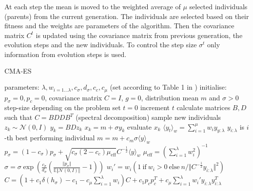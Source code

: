 At each step the mean is moved to the weighted average of $\mu$ selected individuals (parents) from the current generation. The individuals are selected based on their fitness and the weights are parameters of the algorithm. Then the covariance matrix $C^t$ is updated using the covariance matrix from previous generation, the evolution steps and the new individuals. To control the step size $\sigma^t$ only information from evolution steps is used.\cite{hansen2016cma}

\begin{algorithm}[h]
    \begin{algorithmic}[1]
    \caption{CMA-ES}
    \label{alg:cma-es}
        \State parameters: $\lambda, w_{i=1\dots\lambda}, c_\sigma,d_\sigma, c_c, c_\mu$ (set according to Table 1 in \cite{hansen2016cma})
        \State initialise: $p_\sigma=0,p_c=0$, covariance matrix $C=I$, $g=0$, distribution mean $m$ and $\sigma > 0$ step-size depending on the problem
        \State set $t=0$
        \Repeat
            \State increment $t$
            \State calculate matrices $B,D$ such that $C=BDDB^T$ (spectral decomposition)
            \Comment sample new individuals
                \State $z_k \sim \mathcal{N}(0,I)$
                \State $y_k = BDz_k$
                \State $x_k = m+\sigma y_k$
                \State evaluate $x_k$
            \EndFor
            \State $\langle y_t\rangle_w = \sum_{i=1}^\mu w_i y_{y:\lambda} $ \Comment $y_{i:\lambda}$ is $i$-th best performing individual
            \State $m = m+c_m \sigma \langle y\rangle_w$
            \State $p_\sigma = (1-c_\sigma)p_\sigma + \sqrt{c_\sigma (2-c_c)\mu_{\text{eff}}}C^{-\frac{1}{2}}\langle y \rangle_w$ \Comment $\mu_{\text{eff}}=(\sum_{i=1}^\lambda w_i^2)^{-1}$
            \State $\sigma = \sigma \exp(\frac{c_\sigma}{d_\sigma}(\frac{\Vert p_\sigma\Vert}{\mathbb{E}\Vert\mathcal{N}(0,I)\Vert}-1))$
            \State $w_i' = w_i(1\ \text{if}\ w_i> 0\ \text{else}\ n/ \Vert C^{-\frac{1}{2}}y_{i:\lambda}\Vert^2)$
            \State $C = (1+c_1\delta(h_\sigma)-c_1-c_\mu\sum_{i=1}^\lambda w_i)C + c_1p_cp_c^T + c_\mu\sum_{i=1}^\lambda w_i'y_{i:\lambda}y_{i:\lambda}^T$
    \end{algorithmic}
    \end{algorithm}
